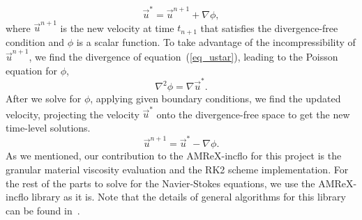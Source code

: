 \begin{equation}
  \vec{u}^* = \vec{u}^{n+1} + \nabla \phi,
  \label{eq_ustar}
\end{equation}
where $\vec{u}^{n+1}$ is the new velocity at time $t_{n+1}$ that satisfies the divergence-free condition and $\phi$ is a scalar function.
To take advantage of the incompressibility of $\vec{u}^{n+1}$, we find the divergence of equation~(\ref{eq_ustar}), leading to the Poisson equation for $\phi$,
\[
  \nabla^2 \phi = \nabla \vec{u}^*.  
\]
After we solve for $\phi$, applying given boundary conditions, we find the updated velocity, projecting the velocity $\vec{u}^*$ onto the divergence-free space to get the new time-level solutions.
\[
  \vec{u}^{n+1} = \vec{u}^* - \nabla \phi.
\]
As we mentioned, our contribution to the AMReX-incflo for this project is the granular material viscosity evaluation and the RK2 scheme implementation. For the rest of the parts to solve for the Navier-Stokes equations, we use the AMReX-incflo library as it is. Note that the details of general algorithms for this library can be found in~\cite{almgren_conservative_1998}.


